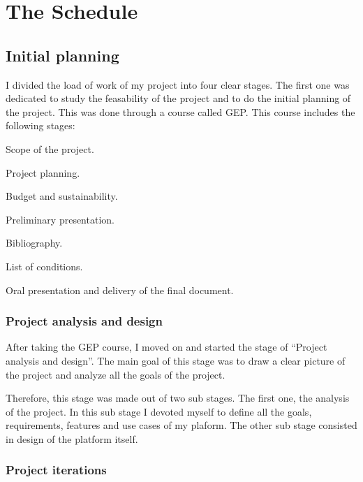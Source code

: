  
\section{The Schedule}

\subsection{Initial planning}

I divided the load of work of my project into four clear stages. The first one
was dedicated to study the feasability of the project and to do the initial
planning of the project. This was done through a course called \ac{GEP}. This
course includes the following stages:

\mylist
  \item Scope of the project.
  \item Project planning.
  \item Budget and sustainability.
  \item Preliminary presentation.
  \item Bibliography.
  \item List of conditions.
  \item Oral presentation and delivery of the final document.
\mylistend

\subsubsection*{Project analysis and design}

After taking the \ac{GEP} course, I moved on and started the stage of ``Project
analysis and design''. The main goal of this stage was to draw a clear picture
of the project and analyze all the goals of the project.

Therefore, this stage was made out of two sub stages. The first one, the
analysis of the project. In this sub stage I devoted myself to define all
the goals, requirements, features and use cases of my plaform. The other sub
stage consisted in design of the platform itself.

\subsubsection*{Project iterations}

